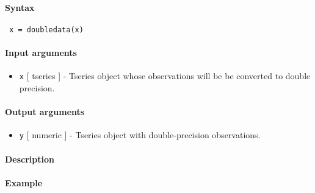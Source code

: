 


	\paragraph{Syntax}
 
 \begin{verbatim}
 x = doubledata(x)
 \end{verbatim}
 
 \paragraph{Input arguments}
 
 \begin{itemize}
 \item
   \texttt{x} {[} tseries {]} - Tseries object whose observations will be
   be converted to double precision.
 \end{itemize}
 
 \paragraph{Output arguments}
 
 \begin{itemize}
 \item
   \texttt{y} {[} numeric {]} - Tseries object with double-precision
   observations.
 \end{itemize}
 
 \paragraph{Description}
 
 \paragraph{Example}


